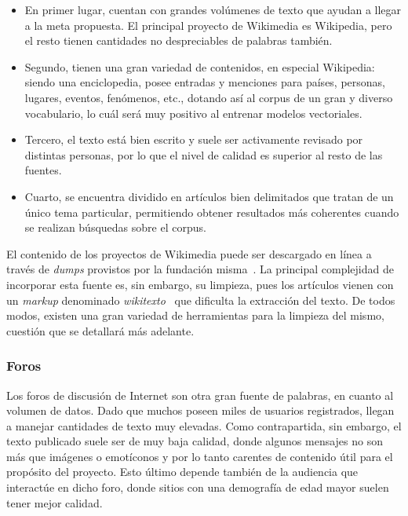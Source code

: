 \begin{itemize}

\item En primer lugar, cuentan con grandes volúmenes de texto que ayudan a llegar a la meta
propuesta. El principal proyecto de Wikimedia es Wikipedia, pero el resto tienen cantidades no
despreciables de palabras también.

\item Segundo, tienen una gran variedad de contenidos, en especial Wikipedia: siendo una
enciclopedia, posee entradas y menciones para países, personas, lugares, eventos, fenómenos, etc.,
dotando así al corpus de un gran y diverso vocabulario, lo cuál será muy positivo al entrenar
modelos vectoriales.

\item Tercero, el texto está bien escrito y suele ser activamente revisado por distintas personas,
por lo que el nivel de calidad es superior al resto de las fuentes.

\item Cuarto, se encuentra dividido en artículos bien delimitados que tratan de un único tema
particular, permitiendo obtener resultados más coherentes cuando se realizan búsquedas sobre el
corpus.

\end{itemize}


El contenido de los proyectos de Wikimedia puede ser descargado en línea a través de \textit{dumps}
provistos por la fundación misma~\cite{WikiDump}. La principal complejidad de incorporar esta fuente
es, sin embargo, su limpieza, pues los artículos vienen con un \textit{markup} denominado
\textit{wikitexto}~\cite{Wikitext} que dificulta la extracción del texto. De todos modos, existen
una gran variedad de herramientas para la limpieza del mismo, cuestión que se detallará más
adelante.


\subsubsection{Foros}

Los foros de discusión de Internet son otra gran fuente de palabras, en cuanto al volumen de
datos. Dado que muchos poseen miles de usuarios registrados, llegan a manejar cantidades de texto
muy elevadas. Como contrapartida, sin embargo, el texto publicado suele ser de muy baja calidad,
donde algunos mensajes no son más que imágenes o emotíconos y por lo tanto carentes de contenido
útil para el propósito del proyecto. Esto último depende también de la audiencia que interactúe en
dicho foro, donde sitios con una demografía de edad mayor suelen tener mejor calidad.

